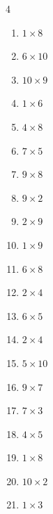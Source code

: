 \begin{multicols}{4}
\begin{enumerate}
  \item $1\times 8$
        \phantom{$=8$}

  \item $6\times 10$
        \phantom{$=60$}

  \item $10\times 9$
        \phantom{$=90$}

  \item $1\times 6$
        \phantom{$=6$}

  \item $4\times 8$
        \phantom{$=32$}

  \item $7\times 5$
        \phantom{$=35$}

  \item $9\times 8$
        \phantom{$=72$}

  \item $9\times 2$
        \phantom{$=18$}

  \item $2\times 9$
        \phantom{$=18$}

  \item $1\times 9$
        \phantom{$=9$}

  \item $6\times 8$
        \phantom{$=48$}

  \item $2\times 4$
        \phantom{$=8$}

  \item $6\times 5$
        \phantom{$=30$}

  \item $2\times 4$
        \phantom{$=8$}

\columnbreak %

  \item $5\times 10$
        \phantom{$=50$}

  \item $9\times 7$
        \phantom{$=63$}

  \item $7\times 3$
        \phantom{$=21$}

  \item $4\times 5$
        \phantom{$=20$}

  \item $1\times 8$
        \phantom{$=8$}

  \item $10\times 2$
        \phantom{$=20$}

  \item $1\times 3$
        \phantom{$=3$}


\end{enumerate}
\end{multicols}
